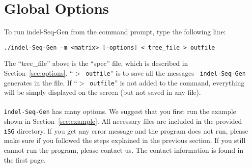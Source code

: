 \documentclass[10pt]{article}
\begin{document}
\section{Global Options}

To run indel-Seq-Gen from the command prompt, type the following line:

\begin{verbatim}
./indel-Seq-Gen -m <matrix> [-options] < tree_file > outfile
\end{verbatim} 

\noindent The ``tree\_file'' above is the ``spec'' file, which is described in
Section~\ref{sec:options}. ``{\tt $>$ outfile}'' is to save all the messages {\tt
indel-Seq-Gen} generates in the file. If ``{\tt $>$ outfile}'' is not added to the command,
everything will be simply displayed on the screen (but not saved in any file).\\~\\

{\tt indel-Seq-Gen} has many options. We suggest that you first run the example shown in
Section~\ref{sec:example}.  All necessary files are included in the provided {\tt iSG}
directory.  If you get any error message and the program does not run, please make sure if you
followed the steps explained in the previous section. If you still cannot run the program,
please contact us. The contact information is found in the first page.
\end{document}
